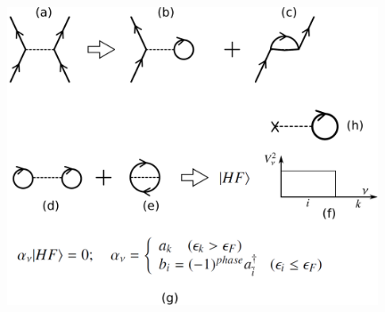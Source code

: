 \begin{figure}[h!]
	\centerline {
		\includegraphics*[width=11cm]{introduccion/figs/figintro4}
	}

\end{figure}
